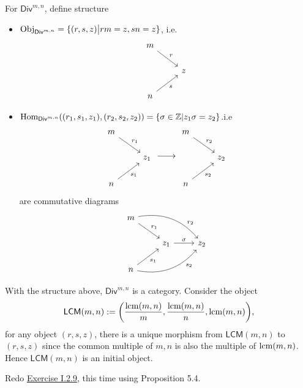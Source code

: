 \begin{solution}
For $\mathsf{Div}^{m,n}$, define structure
\begin{itemize}
\item $\mathrm{Obj}_{\mathsf{Div}^{m,n}}=\{(r, s, z)\big{|} rm=z, sn=z\}$, i.e.
%
\[
\begin{tikzcd}
m\arrow[dr, "r"] &\\
& z\\
n\arrow[ur, "s"']&
\end{tikzcd}
\]
\item $\mathrm{Hom}_{\mathsf{Div}^{m,n}}((r_1, s_1, z_1),(r_2,s_2,z_2)) = \{\sigma\in \mathbb{Z} | z_1\sigma = z_2\}$.i.e
%
\[
\begin{tikzcd}
m\arrow[dr, "r_1"] &\\
& z_1\\
n\arrow[ur, "s_1"']&
\end{tikzcd}
\DOTSB\relbar\joinrel\relbar\joinrel\rightarrow
\begin{tikzcd}
m\arrow[dr, "r_2"] &\\
& z_2\\
n\arrow[ur, "s_2"']&
\end{tikzcd}
\]
are commutative diagrams
%
\[
\begin{tikzcd}
m\arrow[dr, "r_1"] \arrow[drr, bend left, "r_2" near end]&&\\
& z_1\arrow[r,"\sigma"] & z_2\\
n\arrow[ur, "s_1"']\arrow[urr, bend right, "s_2"' near end]&
\end{tikzcd}
\]
\end{itemize}
With the structure above, $\mathsf{Div}^{m,n}$ is a category. Consider the object 
$$\mathsf{LCM}(m,n):=\bigg{(}\frac{\operatorname{lcm}(m,n)}{m},\frac{\operatorname{lcm}(m,n)}{n},\operatorname{lcm}(m,n)\bigg{)},$$
for any object $(r,s,z)$, there is a unique morphism from $\mathsf{LCM}(m,n)$ to $(r,s,z)$
since the common multiple of $m,n$ is also the multiple of $\operatorname{lcm}(m,n)$. Hence $\mathsf{LCM}(m,n)$
is an initial object. 
\end{solution}

\begin{problem}[5.7]
  Redo \hyperlink{Exercise I.2.9}{Exercise I.2.9}, this time using Proposition 5.4.
\end{problem}

